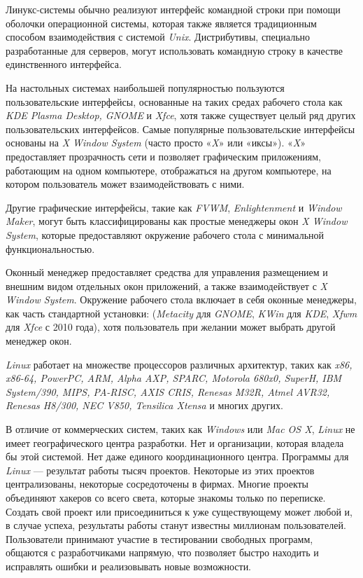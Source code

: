 Линукс-системы обычно реализуют интерфейс командной строки при помощи оболочки операционной системы, которая также является традиционным способом взаимодействия с системой \textit{Unix}. Дистрибутивы, специально разработанные для серверов, могут использовать командную строку в качестве единственного интерфейса.

На настольных системах наибольшей популярностью пользуются пользовательские интерфейсы, основанные на таких средах рабочего стола как \textit{KDE Plasma Desktop, GNOME} и \textit{Xfce}, хотя также существует целый ряд других пользовательских интерфейсов. Самые популярные пользовательские интерфейсы основаны на \textit{X Window System} (часто просто «\textit{X}» или «иксы»). «\textit{X}» предоставляет прозрачность сети и позволяет графическим приложениям, работающим на одном компьютере, отображаться на другом компьютере, на котором пользователь может взаимодействовать с ними.

Другие графические интерфейсы, такие как \textit{FVWM}, \textit{Enlightenment} и \textit{Window Maker}, могут быть классифицированы как простые менеджеры окон \textit{X Window System}, которые предоставляют окружение рабочего стола с минимальной функциональностью.

Оконный менеджер предоставляет средства для управления размещением и внешним видом отдельных окон приложений, а также взаимодействует с \textit{X Window System}. Окружение рабочего стола включает в себя оконные менеджеры, как часть стандартной установки: (\textit{Metacity} для \textit{GNOME}, \textit{\textit{KWin}} для \textit{KDE}, \textit{Xfwm} для \textit{Xfce} с 2010 года), хотя пользователь при желании может выбрать другой менеджер окон.

\textit{Linux} работает на множестве процессоров различных архитектур, таких как \textit{x86, x86-64, PowerPC, ARM, Alpha AXP, SPARC, Motorola 680x0, SuperH, IBM System/390, MIPS, PA-RISC, AXIS CRIS, Renesas M32R, Atmel AVR32, Renesas H8/300, NEC V850, Tensilica Xtensa} и многих других.

В отличие от коммерческих систем, таких как \textit{Windows} или \textit{Mac OS X}, \textit{Linux} не имеет географического центра разработки. Нет и организации, которая владела бы этой системой. Нет даже единого координационного центра. Программы для \textit{Linux} — результат работы тысяч проектов. Некоторые из этих проектов централизованы, некоторые сосредоточены в фирмах. Многие проекты объединяют хакеров со всего света, которые знакомы только по переписке. Создать свой проект или присоединиться к уже существующему может любой и, в случае успеха, результаты работы станут известны миллионам пользователей. Пользователи принимают участие в тестировании свободных программ, общаются с разработчиками напрямую, что позволяет быстро находить и исправлять ошибки и реализовывать новые возможности.